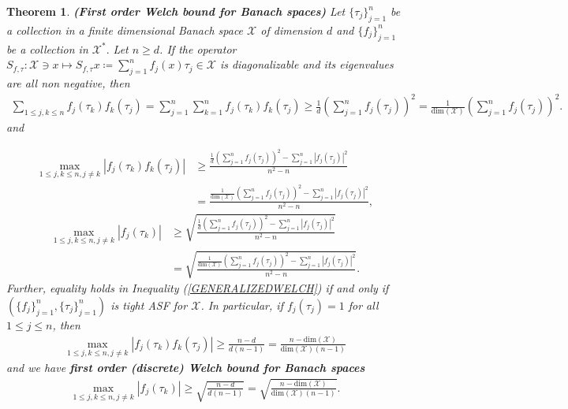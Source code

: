\documentclass{amsart}
\newtheorem{theorem}{Theorem}[section]
\begin{document}
  \begin{theorem}\label{FIRSTWELCHBANACH}
  \textbf{(First order  Welch bound for Banach spaces)}	Let $\{\tau_j\}_{j=1}^n$ be a collection in a finite dimensional Banach space $\mathcal{X}$ of dimension $d$  and 	$\{f_j\}_{j=1}^n$ be a collection in  $\mathcal{X}^*.$ Let $n\geq d$. If the  operator 
  $	S_{f, \tau}:\mathcal{X}\ni x \mapsto S_{f, \tau}x\coloneqq \sum_{j=1}^n
  	f_j(x)\tau_j \in
  	\mathcal{X}$ is diagonalizable and its eigenvalues are all non negative, then 
  	\begin{align}\label{GENERALIZEDWELCH}
 \sum_{1\leq j, k \leq n}f_j(\tau_k)f_k(\tau_j)= \sum_{j=1}^n\sum_{k=1}^nf_j(\tau_k)f_k(\tau_j)\geq \frac{1}{d}	\left(\sum_{j=1}^n
  f_j(\tau_j)\right)^2=\frac{1}{\text{dim}(\mathcal{X})}	\left(\sum_{j=1}^n
  f_j(\tau_j)\right)^2.
  	\end{align}
  	and 
  	
  	\begin{align*}
  \max _{1\leq j,k \leq n, j\neq k}|f_j(\tau_k)f_k(\tau_j)|&\geq \frac{\frac{1}{d}	\left(\sum_{j=1}^n
  	f_j(\tau_j)\right)^2-	\sum_{j=1}^n
  	|f_j(\tau_j)|^2}{n^2-n}\\
  &=\frac{\frac{1}{\text{dim}(\mathcal{X})}	\left(\sum_{j=1}^n
  	f_j(\tau_j)\right)^2-	\sum_{j=1}^n
  	|f_j(\tau_j)|^2}{n^2-n},
  	\end{align*}
  	\begin{align*}
  	\max _{1\leq j,k \leq n, j\neq k}|f_j(\tau_k)|&\geq \sqrt{\frac{\frac{1}{d}	\left(\sum_{j=1}^n
  			f_j(\tau_j)\right)^2-	\sum_{j=1}^n
  			|f_j(\tau_j)|^2}{n^2-n}}\\
  		&=\sqrt{\frac{\frac{1}{\text{dim}(\mathcal{X})}	\left(\sum_{j=1}^n
  				f_j(\tau_j)\right)^2-	\sum_{j=1}^n
  				|f_j(\tau_j)|^2}{n^2-n}}.
  	\end{align*}
  	Further, equality holds in Inequality (\ref{GENERALIZEDWELCH}) if and only if $ (\{f_j \}_{j=1}^n, \{\tau_j \}_{j=1}^n) $ is  tight  ASF for $\mathcal{X}$. 
  	In particular, if $f_j(\tau_j)=1$ for all $1\leq j \leq n$, then 
  \begin{align*}
  \max _{1\leq j,k \leq n, j\neq k}|f_j(\tau_k)f_k(\tau_j)|\geq \frac{n-d}{d(n-1)}=\frac{n-\text{dim}(\mathcal{X})}{\text{dim}(\mathcal{X})(n-1)}
  \end{align*}
  and we have \textbf{first order (discrete) Welch bound for Banach spaces}
  \begin{align*}
	 \max _{1\leq j,k \leq n, j\neq k}|f_j(\tau_k)|\geq \sqrt{\frac{n-d}{d(n-1)}}= \sqrt{\frac{n-\text{dim}(\mathcal{X})}{\text{dim}(\mathcal{X})(n-1)}}.
  \end{align*}
  \end{theorem}
\end{document}

